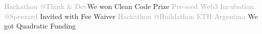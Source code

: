 
\begin{cvtable}

    {\textcolor{darkgray}
    {Hackathon @Think \& Dev}}{We won Clean Code Prize}{{%
    {
    } }}
%
    {\textcolor{darkgray}
    {Pre-seed Web3 Incubation @Speezard
  }}{Invited with Fee Waiver}{{%
    {
    } }}
%
    {\textcolor{darkgray}
    {Hackathon @Buildathon ETH Argentina
  }}{We got Quadratic Funding}{{%
    {
    } }}
\end{cvtable}

